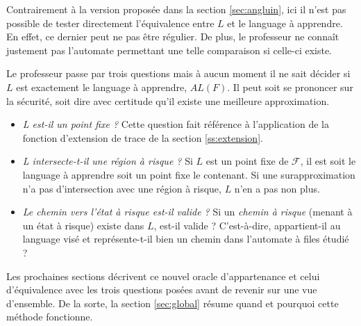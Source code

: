 Contrairement à la version proposée dans la section \ref{sec:angluin}, ici il n'est pas possible de tester directement l'équivalence entre $L$ et le language à apprendre. En effet, ce dernier peut ne pas être régulier. De plus, le professeur ne connaît justement pas l'automate permettant une telle comparaison si celle-ci existe.

Le professeur passe par trois questions mais à aucun moment il ne sait décider si $L$ est exactement le language à apprendre, $AL(F)$. Il peut soit se prononcer sur la sécurité, soit dire avec certitude qu'il existe une meilleure approximation.

\begin{itemize}
	\item \emph{L est-il un point fixe ?} Cette question fait référence à l'application de la fonction d'extension de trace de la section \ref{ss:extension}.
	\item \emph{L intersecte-t-il une région à risque ?} Si $L$ est un point fixe de $\mathcal{F}$, il est soit le language à apprendre soit un point fixe le contenant. Si une surapproximation n'a pas d'intersection avec une région à risque, $L$ n'en a pas non plus.
	\item \emph{Le chemin vers l'état à risque est-il valide ?} Si un \emph{chemin à risque} (menant à un état à risque) existe dans $L$, est-il valide ? C'est-à-dire, appartient-il au language visé et représente-t-il bien un chemin dans l'automate à files étudié ?
\end{itemize}

Les prochaines sections décrivent ce nouvel oracle d'appartenance et celui d'équivalence avec les trois questions posées avant de revenir sur une vue d'ensemble. De la sorte, la section \ref{sec:global} résume quand et pourquoi cette méthode fonctionne.
